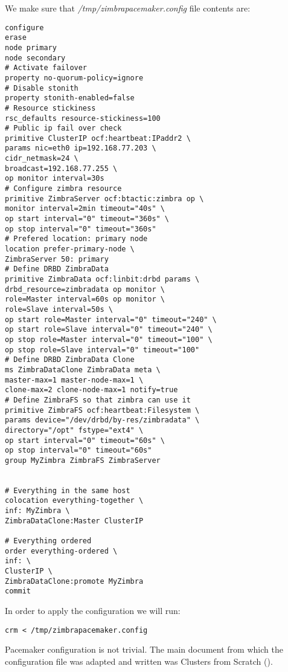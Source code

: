 We make sure that \textit{/tmp/zimbrapacemaker.config} file contents are:
\begin{verbatim}
configure
erase
node primary
node secondary
# Activate failover
property no-quorum-policy=ignore
# Disable stonith
property stonith-enabled=false
# Resource stickiness
rsc_defaults resource-stickiness=100
# Public ip fail over check
primitive ClusterIP ocf:heartbeat:IPaddr2 \
params nic=eth0 ip=192.168.77.203 \
cidr_netmask=24 \
broadcast=192.168.77.255 \
op monitor interval=30s
# Configure zimbra resource
primitive ZimbraServer ocf:btactic:zimbra op \
monitor interval=2min timeout="40s" \
op start interval="0" timeout="360s" \
op stop interval="0" timeout="360s"
# Prefered location: primary node
location prefer-primary-node \
ZimbraServer 50: primary
# Define DRBD ZimbraData
primitive ZimbraData ocf:linbit:drbd params \
drbd_resource=zimbradata op monitor \
role=Master interval=60s op monitor \
role=Slave interval=50s \
op start role=Master interval="0" timeout="240" \
op start role=Slave interval="0" timeout="240" \
op stop role=Master interval="0" timeout="100" \
op stop role=Slave interval="0" timeout="100"
# Define DRBD ZimbraData Clone
ms ZimbraDataClone ZimbraData meta \
master-max=1 master-node-max=1 \
clone-max=2 clone-node-max=1 notify=true
# Define ZimbraFS so that zimbra can use it
primitive ZimbraFS ocf:heartbeat:Filesystem \
params device="/dev/drbd/by-res/zimbradata" \
directory="/opt" fstype="ext4" \
op start interval="0" timeout="60s" \
op stop interval="0" timeout="60s"
group MyZimbra ZimbraFS ZimbraServer


# Everything in the same host
colocation everything-together \
inf: MyZimbra \
ZimbraDataClone:Master ClusterIP

# Everything ordered
order everything-ordered \
inf: \
ClusterIP \
ZimbraDataClone:promote MyZimbra
commit
\end{verbatim}

In order to apply the configuration we will run:
\begin{verbatim}
crm < /tmp/zimbrapacemaker.config
\end{verbatim}

Pacemaker configuration is not trivial. The main document from which the configuration file was adapted and written was Clusters from Scratch (\cite{ClustersFromScratch}).